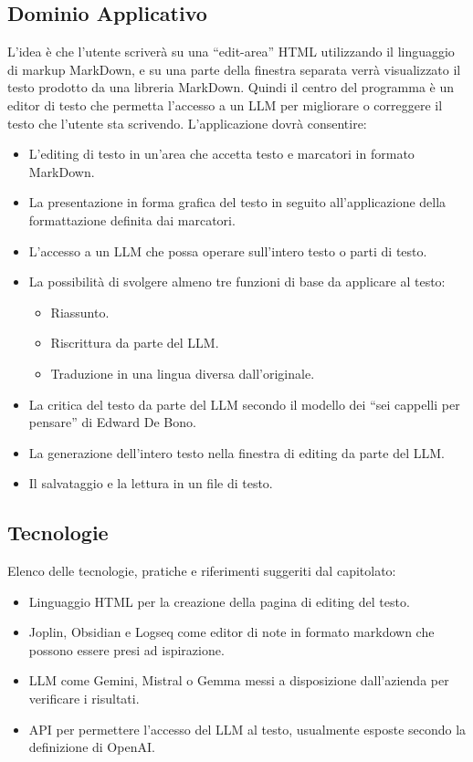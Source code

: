 \documentclass[a4paper,12pt]{article}
\begin{document}
    \subsection{Dominio Applicativo}
    L’idea è che l’utente scriverà su una “edit-area” HTML utilizzando il linguaggio di markup MarkDown, e su una parte della finestra separata verrà visualizzato il testo prodotto da una libreria MarkDown. Quindi il centro del programma è un editor di testo che permetta l’accesso a un LLM per migliorare o correggere il testo che l’utente sta scrivendo.
    L’applicazione dovrà consentire:
    \begin{itemize}
		\item L’editing di testo in un'area che accetta testo e marcatori in formato MarkDown. 
		\item La presentazione in forma grafica del testo in seguito all’applicazione della formattazione definita dai marcatori.
		\item L’accesso a un LLM che possa operare sull’intero testo o parti di testo.
		\item La possibilità di svolgere almeno tre funzioni di base da applicare al testo:
        \begin{itemize}
	        \item Riassunto.
	        \item Riscrittura da parte del LLM.
	        \item Traduzione in una lingua diversa dall’originale.
        \end{itemize}
		\item La critica del testo da parte del LLM secondo il modello dei “sei cappelli per pensare” di Edward De Bono.
		\item La generazione dell’intero testo nella finestra di editing da parte del LLM.
		\item Il salvataggio e la lettura in un file di testo.
    \end{itemize}
    \subsection{Tecnologie}
    Elenco delle tecnologie, pratiche e riferimenti suggeriti dal capitolato:
    \begin{itemize}
		\item Linguaggio HTML per la creazione della pagina di editing del testo.
		\item Joplin, Obsidian e Logseq come editor di note in formato markdown che possono essere presi ad ispirazione.
		\item LLM come Gemini, Mistral o Gemma messi a disposizione dall’azienda per verificare i risultati.
		\item API per permettere l’accesso del LLM al testo, usualmente esposte secondo la definizione di OpenAI.
    \end{itemize}
\end{document}
